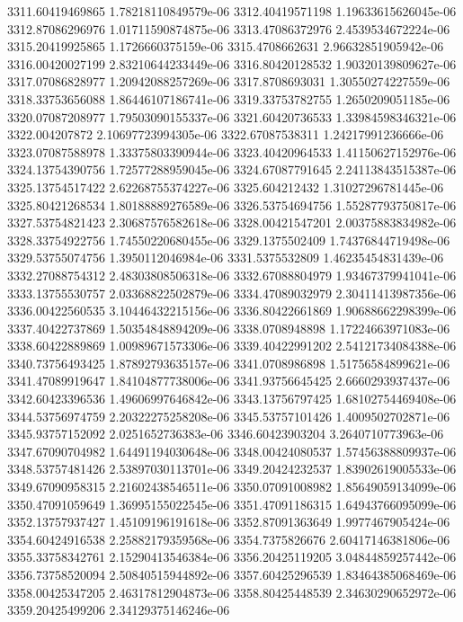 {3311.60419469865 1.78218110849579e-06
3312.40419571198 1.19633615626045e-06
3312.87086296976 1.01711590874875e-06
3313.47086372976 2.4539534672224e-06
3315.20419925865 1.1726660375159e-06
3315.4708662631 2.96632851905942e-06
3316.00420027199 2.83210644233449e-06
3316.80420128532 1.90320139809627e-06
3317.07086828977 1.20942088257269e-06
3317.8708693031 1.30550274227559e-06
3318.33753656088 1.86446107186741e-06
3319.33753782755 1.2650209051185e-06
3320.07087208977 1.79503090155337e-06
3321.60420736533 1.33984598346321e-06
3322.004207872 2.10697723994305e-06
3322.67087538311 1.24217991236666e-06
3323.07087588978 1.33375803390944e-06
3323.40420964533 1.41150627152976e-06
3324.13754390756 1.72577288959045e-06
3324.67087791645 2.24113843515387e-06
3325.13754517422 2.62268755374227e-06
3325.604212432 1.31027296781445e-06
3325.80421268534 1.80188889276589e-06
3326.53754694756 1.55287793750817e-06
3327.53754821423 2.30687576582618e-06
3328.00421547201 2.00375883834982e-06
3328.33754922756 1.74550220680455e-06
3329.1375502409 1.74376844719498e-06
3329.53755074756 1.3950112046984e-06
3331.5375532809 1.46235454831439e-06
3332.27088754312 2.48303808506318e-06
3332.67088804979 1.93467379941041e-06
3333.13755530757 2.03368822502879e-06
3334.47089032979 2.30411413987356e-06
3336.00422560535 3.10446432215156e-06
3336.80422661869 1.90688662298399e-06
3337.40422737869 1.50354848894209e-06
3338.0708948898 1.17224663971083e-06
3338.60422889869 1.00989671573306e-06
3339.40422991202 2.54121734084388e-06
3340.73756493425 1.87892793635157e-06
3341.0708986898 1.51756584899621e-06
3341.47089919647 1.84104877738006e-06
3341.93756645425 2.6660293937437e-06
3342.60423396536 1.49606997646842e-06
3343.13756797425 1.68102754469408e-06
3344.53756974759 2.20322275258208e-06
3345.53757101426 1.4009502702871e-06
3345.93757152092 2.0251652736383e-06
3346.60423903204 3.2640710773963e-06
3347.67090704982 1.64491194030648e-06
3348.00424080537 1.57456388809937e-06
3348.53757481426 2.53897030113701e-06
3349.20424232537 1.83902619005533e-06
3349.67090958315 2.21602438546511e-06
3350.07091008982 1.85649059134099e-06
3350.47091059649 1.36995155022545e-06
3351.47091186315 1.64943766095099e-06
3352.13757937427 1.45109196191618e-06
3352.87091363649 1.9977467905424e-06
3354.60424916538 2.25882179359568e-06
3354.7375826676 2.60417146381806e-06
3355.33758342761 2.15290413546384e-06
3356.20425119205 3.04844859257442e-06
3356.73758520094 2.50840515944892e-06
3357.60425296539 1.83464385068469e-06
3358.00425347205 2.46317812904873e-06
3358.80425448539 2.34630290652972e-06
3359.20425499206 2.34129375146246e-06
}
